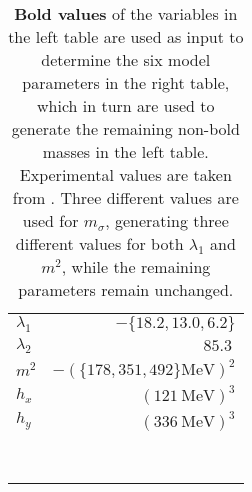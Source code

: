 \begin{table}
\begin{tabular}{ l r }
	$\lambda_1$ & $-\{18.2,13.0,6.2\}$                        \\
	$\lambda_2$ & $ \SI{85.3}{}$                        \\
	$m^2$       & $-(\{178,351,492\}\si{\mega\electronvolt})^2$ \\
	$h_x$       & $(\SI{121}{\mega\electronvolt})^3$  \\
	$h_y$       & $(\SI{336}{\mega\electronvolt})^3$  \\
	\\
	\\
	\\
	\\
	\\
	\\
	\\
	\vspace{-2pt} \\ %
	\bottomrule 
\end{tabular}
\caption{\label{tab:lsm3f:parameters}%
\textbf{Bold values} of the variables in the left table are used as input to determine the six model parameters in the right table,
which in turn are used to generate the remaining non-bold masses in the left table.
Experimental values are taken from \cite{ref:pdg_review_2021}.
Three different values are used for $m_\sigma$, generating three different values for both $\lambda_1$ and $m^2$, while the remaining parameters remain unchanged.
}
\end{table}

